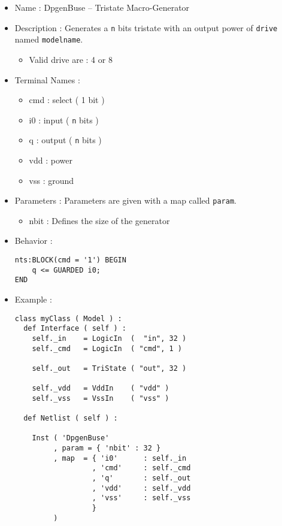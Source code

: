 \begin{itemize}
    \item Name : DpgenBuse -- Tristate Macro-Generator
    \item Description : Generates a \verb-n- bits tristate with an output power of \verb-drive- named \verb-modelname-.
    \begin{itemize}
        \item Valid drive are : 4 or 8
    \end{itemize}
    \item Terminal Names :
    \begin{itemize}
        \item cmd : select ( 1 bit )
        \item i0 : input ( \verb-n- bits )
        \item q : output ( \verb-n- bits )
        \item vdd : power
        \item vss : ground
    \end{itemize}
    \item Parameters : Parameters are given with a map called \verb-param-.
    \begin{itemize}
        \item nbit : Defines the size of the generator
    \end{itemize}
    \item Behavior :
\begin{verbatim}
nts:BLOCK(cmd = '1') BEGIN
    q <= GUARDED i0;
END
\end{verbatim}
    \item Example :
\begin{verbatim}
class myClass ( Model ) :
  def Interface ( self ) :
    self._in    = LogicIn  (  "in", 32 )
    self._cmd   = LogicIn  ( "cmd", 1 )
    
    self._out   = TriState ( "out", 32 )

    self._vdd   = VddIn    ( "vdd" )
    self._vss   = VssIn    ( "vss" )
    
  def Netlist ( self ) :
      
    Inst ( 'DpgenBuse'
         , param = { 'nbit' : 32 }
         , map  = { 'i0'      : self._in
                  , 'cmd'     : self._cmd
                  , 'q'       : self._out
                  , 'vdd'     : self._vdd
                  , 'vss'     : self._vss
                  }
         )
\end{verbatim}
\end{itemize}
